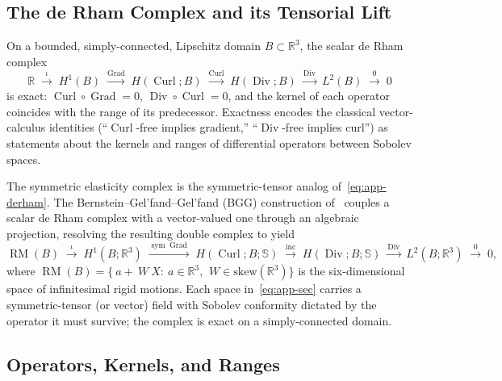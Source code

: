 \documentclass[12pt]{article}
\newcommand{\Reals}{\mathbb{R}}
\newcommand{\Syms}{\mathbb{S}}
\DeclareMathOperator{\Div}{Div}
\DeclareMathOperator{\Grad}{Grad}
\DeclareMathOperator{\Curl}{Curl}
\DeclareMathOperator{\sym}{sym}
\begin{document}
\subsection{The de Rham Complex and its Tensorial Lift}
\label{app:sec-derham}

On a bounded, simply-connected, Lipschitz domain
$B \subset \Reals^3$, the scalar de Rham complex
\begin{equation}
  \label{eq:app-derham}
  \Reals
  \;\xrightarrow{\iota}\;
  H^1(B)
  \;\xrightarrow{\Grad}\;
  H(\Curl; B)
  \;\xrightarrow{\Curl}\;
  H(\Div; B)
  \;\xrightarrow{\Div}\;
  L^2(B)
  \;\xrightarrow{0}\; 0
\end{equation}
is exact: $\Curl \circ \Grad = 0$, $\Div \circ \Curl = 0$, and the
kernel of each operator coincides with the range of its predecessor.
Exactness encodes the classical vector-calculus identities
(``$\Curl$-free implies gradient,'' ``$\Div$-free implies curl'') as
statements about the kernels and ranges of differential operators
between Sobolev spaces.

The symmetric elasticity complex is the symmetric-tensor analog
of~\eqref{eq:app-derham}. The Bernstein--Gel'fand--Gel'fand (BGG)
construction of~\citet{Arnold.Falk.Winther:2006a,
Arnold.Falk.Winther:2010} couples a scalar de Rham complex with a
vector-valued one through an algebraic projection, resolving the
resulting double complex to yield
\begin{equation}
  \label{eq:app-sec}
  \operatorname{RM}(B)
  \;\xrightarrow{\iota}\;
  H^1(B; \Reals^3)
  \;\xrightarrow{\sym\Grad}\;
  H(\Curl; B; \Syms)
  \;\xrightarrow{\mathrm{inc}}\;
  H(\Div; B; \Syms)
  \;\xrightarrow{\Div}\;
  L^2(B; \Reals^3)
  \;\xrightarrow{0}\; 0,
\end{equation}
where $\operatorname{RM}(B) = \{ ~a + ~W ~X : ~a \in \Reals^3,\,
~W \in \mathrm{skew}(\Reals^3) \}$ is the six-dimensional space of
infinitesimal rigid motions. Each space in~\eqref{eq:app-sec} carries
a symmetric-tensor (or vector) field with Sobolev conformity
dictated by the operator it must survive; the complex is exact on a
simply-connected domain.

\subsection{Operators, Kernels, and Ranges}
\label{app:sec-ops}
\end{document}
